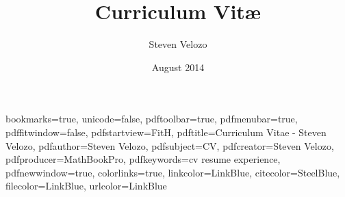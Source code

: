 
\usepackage{amsmath}

\usepackage{graphicx}
\graphicspath{{graphics/}}

\title{Curriculum Vit\ae}
\author[Steven Velozo]{Steven Velozo}
\date{August 2014}
\newcommand{\displayaddress}{\marginnote[0.9cm]{\raggedleft{\href{mailto:steven@velozo.com}{steven@velozo.com}\\(206) 604-4981 }}}

\usepackage{booktabs}
\usepackage{units}
\usepackage{fancyvrb}

\usepackage{multicol}

\usepackage{rotating}
\usepackage{tikz}
\usetikzlibrary{arrows,backgrounds,snakes}


\newcommand{\mhstandout}[1]{\textbf{\textcolor{DarkGray}{#1}}}
\newcommand{\shstandout}[1]{\textbf{\textcolor{BurntOrange}{#1}}}
\newcommand{\shyears}[1]{\small{\texttt{\textcolor{LightGray}{#1}}}}
\newcommand{\pstandout}[1]{\textcolor{BrightRed}{#1}}
\newcommand{\competency}[1]{\textcolor{BrightRed}{#1}}

\hypersetup
{
    bookmarks=true,         %
    unicode=false,          %
    pdftoolbar=true,        %
    pdfmenubar=true,        %
    pdffitwindow=false,     %
    pdfstartview={FitH},    %
    pdftitle={Curriculum Vitae - Steven Velozo},    %
    pdfauthor={Steven Velozo},     %
    pdfsubject={CV},   %
    pdfcreator={Steven Velozo},   %
    pdfproducer={MathBookPro}, %
    pdfkeywords={cv} {resume} {experience}, %
    pdfnewwindow=true,      %
    colorlinks=true,       %
    linkcolor=LinkBlue,          %
    citecolor=SteelBlue,        %
    filecolor=LinkBlue,      %
    urlcolor=LinkBlue           %
}

\makeatletter
\newlength{\fullpagewidth}
\AtBeginDocument{\setlength{\fullpagewidth}{\@tufte@fullwidth}}
\makeatother

\newcommand{\fullwidthmode}[1]{\noindent\begin{minipage}{\fullpagewidth}#1\end{minipage}}
